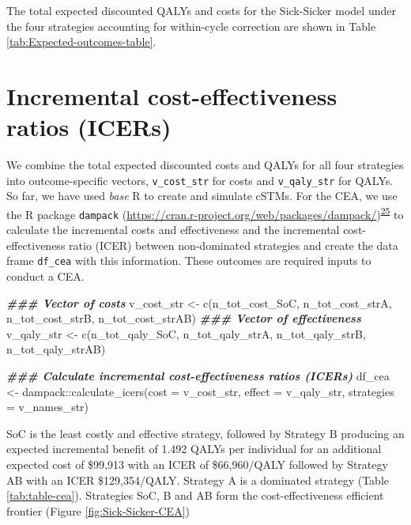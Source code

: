 \documentclass[
]{article}
\newenvironment{Shaded}{\begin{snugshade}}{\end{snugshade}}
\newcommand{\AttributeTok}[1]{\textcolor[rgb]{0.77,0.63,0.00}{#1}}
\newcommand{\DocumentationTok}[1]{\textcolor[rgb]{0.56,0.35,0.01}{\textbf{\textit{#1}}}}
\newcommand{\FunctionTok}[1]{\textcolor[rgb]{0.00,0.00,0.00}{#1}}
\newcommand{\NormalTok}[1]{#1}
\newcommand{\OtherTok}[1]{\textcolor[rgb]{0.56,0.35,0.01}{#1}}
\newcommand{\SpecialCharTok}[1]{\textcolor[rgb]{0.00,0.00,0.00}{#1}}
\begin{document}
The total expected discounted QALYs and costs for the Sick-Sicker model under the four strategies accounting for within-cycle correction are shown in Table \ref{tab:Expected-outcomes-table}.

\hypertarget{incremental-cost-effectiveness-ratios-icers}{%
\section{Incremental cost-effectiveness ratios (ICERs)}\label{incremental-cost-effectiveness-ratios-icers}}

We combine the total expected discounted costs and QALYs for all four strategies into outcome-specific vectors, \texttt{v\_cost\_str} for costs and \texttt{v\_qaly\_str} for QALYs. So far, we have used \emph{base} R to create and simulate cSTMs. For the CEA, we use the R package \texttt{dampack} (\url{https://cran.r-project.org/web/packages/dampack/})\textsuperscript{\protect\hyperlink{ref-Alarid-Escudero2021}{25}} to calculate the incremental costs and effectiveness and the incremental cost-effectiveness ratio (ICER) between non-dominated strategies and create the data frame \texttt{df\_cea} with this information. These outcomes are required inputs to conduct a CEA.

\begin{Shaded}
\begin{Highlighting}[]
\DocumentationTok{\#\#\# Vector of costs}
\NormalTok{v\_cost\_str }\OtherTok{\textless{}{-}} \FunctionTok{c}\NormalTok{(n\_tot\_cost\_SoC, n\_tot\_cost\_strA, n\_tot\_cost\_strB, n\_tot\_cost\_strAB)}
\DocumentationTok{\#\#\# Vector of effectiveness}
\NormalTok{v\_qaly\_str }\OtherTok{\textless{}{-}} \FunctionTok{c}\NormalTok{(n\_tot\_qaly\_SoC, n\_tot\_qaly\_strA, n\_tot\_qaly\_strB, n\_tot\_qaly\_strAB)}

\DocumentationTok{\#\#\# Calculate incremental cost{-}effectiveness ratios (ICERs)}
\NormalTok{df\_cea }\OtherTok{\textless{}{-}}\NormalTok{ dampack}\SpecialCharTok{::}\FunctionTok{calculate\_icers}\NormalTok{(}\AttributeTok{cost =}\NormalTok{ v\_cost\_str, }
                                   \AttributeTok{effect =}\NormalTok{ v\_qaly\_str,}
                                   \AttributeTok{strategies =}\NormalTok{ v\_names\_str)}
\end{Highlighting}
\end{Shaded}

SoC is the least costly and effective strategy, followed by Strategy B producing an expected incremental benefit of 1.492 QALYs per individual for an additional expected cost of \$99,913 with an ICER of \$66,960/QALY followed by Strategy AB with an ICER \$129,354/QALY. Strategy A is a dominated strategy (Table \ref{tab:table-cea}). Strategies SoC, B and AB form the cost-effectiveness efficient frontier (Figure \ref{fig:Sick-Sicker-CEA})
\end{document}
